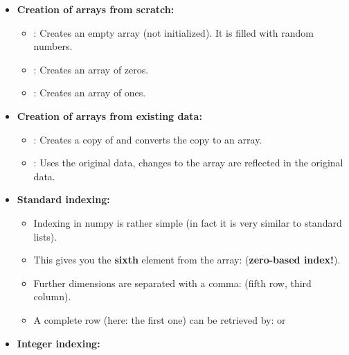 \begin{frame}
	\begin{itemize}
		\item \textbf{Creation of arrays from scratch:}
		\begin{itemize}
			\item {}: Creates an empty array (not initialized). It is filled with random numbers.
			\item {}: Creates an array of zeros.
			\item {}: Creates an array of ones.
		\end{itemize}
	\end{itemize}
	
	\begin{itemize}
		\item \textbf{Creation of arrays from existing data:}
		\begin{itemize}
			\item {}: Creates a copy of  and converts the copy to an array.
			\item {}: Uses the original data, changes to the array are reflected in the original data.
		\end{itemize}
	\end{itemize}
\end{frame}


\begin{frame}
	\begin{itemize}
		\item \textbf{Standard indexing:}
		\begin{itemize}
			\item Indexing in numpy is rather simple (in fact it is very similar to standard lists).
			\item This gives you the \textbf{sixth} element from the array:  (\textbf{zero-based index!}).
			\item Further dimensions are separated with a comma:  (fifth row, third column).
			\item A complete row (here: the first one) can be retrieved by:  or 
		\end{itemize}
		\item \textbf{Integer indexing:}
	\end{itemize}
	
	
\end{frame}


